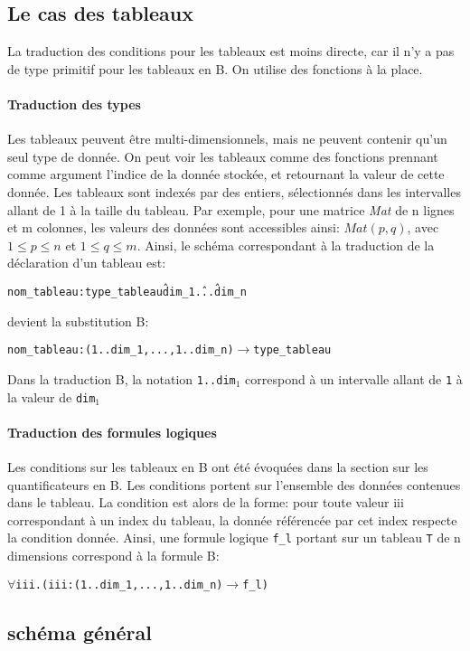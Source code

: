 \subsection{Le cas des tableaux}
La traduction des conditions pour les tableaux est moins directe, car il n'y a
pas de type primitif pour les tableaux en B. On utilise des fonctions à la
place. 

\paragraph{Traduction des types}
Les tableaux peuvent être multi-dimensionnels, mais ne peuvent contenir qu'un
seul type de donnée. On peut voir les tableaux comme des fonctions prennant
comme argument l'indice de la donnée stockée, et retournant la valeur de cette
donnée. Les tableaux sont indexés par des entiers, sélectionnés dans les
intervalles allant de 1 à la taille du tableau.
Par exemple, pour une matrice \emph{Mat} de n lignes et m colonnes, les valeurs
des données sont accessibles ainsi: $Mat(p, q)$, avec $1 \leq p \leq n$ et $1 \leq q
\leq m$.
Ainsi, le schéma correspondant à la traduction de la déclaration d'un tableau
est:
\begin{alltt}
nom\_tableau : type\_tableau \^ dim_1 \^ ... \^ dim_n
\end{alltt}
devient la substitution B:
\begin{alltt}
nom\_tableau : (1..dim_1, ..., 1..dim_n) \(\rightarrow\) type\_tableau 
\end{alltt}
Dans la traduction B, la notation \texttt{1..dim$_1$} correspond à un
intervalle allant de \texttt{1} à la valeur de \texttt{dim$_1$}
\paragraph{Traduction des formules logiques}
Les conditions sur les tableaux en B ont été évoquées dans la section sur les
quantificateurs en B. Les conditions portent sur l'ensemble des données
contenues dans le tableau. La condition est alors de la forme: pour toute valeur
iii correspondant à un index du tableau, la donnée référencée par cet index
respecte la condition donnée. Ainsi, une formule logique \texttt{f\_l} portant sur un
tableau \texttt{T} de n dimensions correspond à la formule B: 
\begin{alltt}
\(\forall \)iii. (iii : (1..dim_1, ..., 1..dim_n) \(\rightarrow\) f\_l)
\end{alltt}

\subsection{schéma général}

